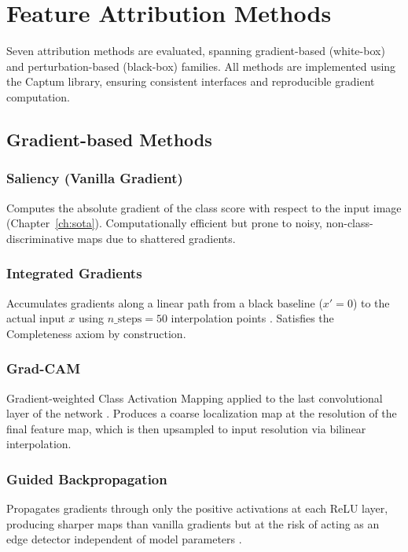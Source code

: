 \section{Feature Attribution Methods}
\label{sec:fae-methods}

Seven attribution methods are evaluated, spanning gradient-based (white-box)
and perturbation-based (black-box) families. All methods are implemented
using the Captum library, ensuring consistent interfaces and reproducible
gradient computation.

\subsection{Gradient-based Methods}

\subsubsection{Saliency (Vanilla Gradient)}
Computes the absolute gradient of the class score with respect to the input
image (Chapter~\ref{ch:sota}). Computationally efficient but prone to noisy,
non-class-discriminative maps due to shattered gradients.

\subsubsection{Integrated Gradients}
Accumulates gradients along a linear path from a black baseline ($x' = 0$)
to the actual input $x$ using $n\_\text{steps} = 50$ interpolation points
\cite{sundararajan2017axiomatic}. Satisfies the Completeness axiom by
construction.

\subsubsection{Grad-CAM}
Gradient-weighted Class Activation Mapping applied to the last convolutional
layer of the network \cite{selvaraju2017grad}. Produces a coarse
localization map at the resolution of the final feature map, which is then
upsampled to input resolution via bilinear interpolation.

\subsubsection{Guided Backpropagation}
Propagates gradients through only the positive activations at each ReLU
layer, producing sharper maps than vanilla gradients but at the risk of
acting as an edge detector independent of model parameters
\cite{springenberg2015}.

